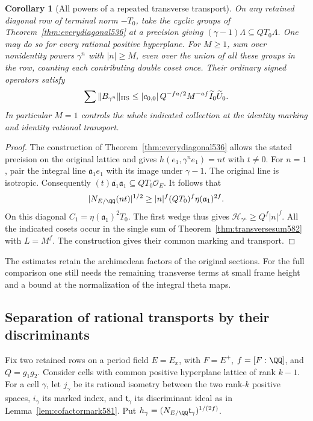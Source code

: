 \documentclass[a4paper,11pt]{article}
\newtheorem{corollary}[proposition]{Corollary}
\theoremstyle{definition}
\theoremstyle{remark}
\numberwithin{equation}{section}
\begin{document}
\begin{corollary}[All powers of a repeated transverse transport]
\leavevmode\label{cor:cyclicuniform582}
On any retained diagonal row of terminal norm \(-T_0\), take
the cyclic groups of Theorem~\ref{thm:everydiagonal536} at a
precision giving \((\gamma-1)\Lambda\subseteq QT_0\Lambda\).
One may do so for every rational positive hyperplane. For
\(M\ge1\), sum over nonidentity powers \(\gamma^n\) with
\(|n|\ge M\), even over the union of all these groups in the
row, counting each contributing double coset once. Their
ordinary signed operators satisfy
\[
       \sum\|B_{\gamma^n}\|_{\rm HS}
       \le |c_{0,0}|\,Q^{-fa/2}M^{-af}
                                \widetilde I_0\widetilde U_0 .
\]
In particular \(M=1\) controls the whole indicated collection
at the identity marking and identity rational transport.
\end{corollary}
\begin{proof}
The construction of Theorem~\ref{thm:everydiagonal536} allows
the stated precision on the original lattice and gives
\(h(e_1,\gamma^n e_1)=nt\) with \(t\ne0\). For \(n=1\),
pair the integral line \(\mathfrak a_1e_1\) with its image
under \(\gamma-1\). The original line is isotropic. Consequently
\((t)\overline{\mathfrak a_1}\mathfrak a_1
\subseteq QT_0\mathcal O_E\).
It follows that
\[
   |N_{E/\QQ}(nt)|^{1/2}
      \ge |n|^f(QT_0)^f\eta(\mathfrak a_1)^{2f}.
\]
On this diagonal \(C_1=\eta(\mathfrak a_1)^2T_0\).
The first wedge thus gives \(\mathcal H_{\gamma^n}\ge
Q^f|n|^f\). All the indicated cosets occur in the single sum
of Theorem~\ref{thm:transversesum582} with \(L=M^f\). The
construction gives their common marking and transport.
\end{proof}

The estimates retain the archimedean factors of the original
sections. For the full comparison one still needs the remaining
transverse terms at small frame height and a bound at the
normalization of the integral theta maps.


\subsection{Separation of rational transports by their discriminants}
\label{sec:transportpacking589}

Fix two retained rows on a period field \(E=E_x\), with
\(F=E^+\), \(f=[F:\QQ]\), and \(Q=g_1g_2\). Consider cells
with common positive hyperplane lattice of rank \(k-1\).
For a cell \(\gamma\), let \(j_\gamma\) be its rational isometry
between the two rank-\(k\) positive spaces, \(i_\gamma\) its
marked index, and \(\mathfrak t_\gamma\) its discriminant ideal
as in Lemma~\ref{lem:cofactormark581}. Put
\(h_\gamma=(N_{E/\QQ}\mathfrak t_\gamma)^{1/(2f)}\).
\end{document}
